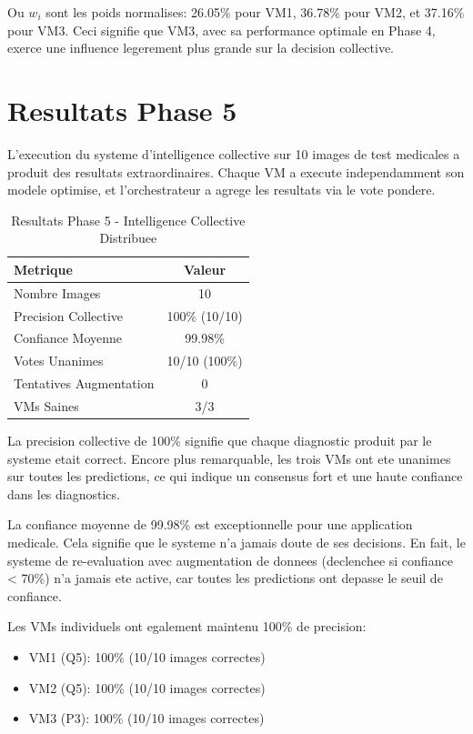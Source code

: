 \documentclass[12pt,a4paper]{report}
\begin{document}
Ou $w_i$ sont les poids normalises: 26.05\% pour VM1, 36.78\% pour VM2, et 37.16\% pour VM3. Ceci signifie que VM3, avec sa performance optimale en Phase 4, exerce une influence legerement plus grande sur la decision collective.

\section{Resultats Phase 5}

L'execution du systeme d'intelligence collective sur 10 images de test medicales a produit des resultats extraordinaires. Chaque VM a execute independamment son modele optimise, et l'orchestrateur a agrege les resultats via le vote pondere.

\begin{table}[H]
\centering
\begin{tabular}{|l|c|}
\hline
\textbf{Metrique} & \textbf{Valeur} \\
\hline
Nombre Images & 10 \\
Precision Collective & 100\% (10/10) \\
Confiance Moyenne & 99.98\% \\
Votes Unanimes & 10/10 (100\%) \\
Tentatives Augmentation & 0 \\
VMs Saines & 3/3 \\
\hline
\end{tabular}
\caption{Resultats Phase 5 - Intelligence Collective Distribuee}
\end{table}

La precision collective de 100\% signifie que chaque diagnostic produit par le systeme etait correct. Encore plus remarquable, les trois VMs ont ete unanimes sur toutes les predictions, ce qui indique un consensus fort et une haute confiance dans les diagnostics.

La confiance moyenne de 99.98\% est exceptionnelle pour une application medicale. Cela signifie que le systeme n'a jamais doute de ses decisions. En fait, le systeme de re-evaluation avec augmentation de donnees (declenchee si confiance < 70\%) n'a jamais ete active, car toutes les predictions ont depasse le seuil de confiance.

Les VMs individuels ont egalement maintenu 100\% de precision:
\begin{itemize}
    \item VM1 (Q5): 100\% (10/10 images correctes)
    \item VM2 (Q5): 100\% (10/10 images correctes)
    \item VM3 (P3): 100\% (10/10 images correctes)
\end{itemize}
\end{document}
